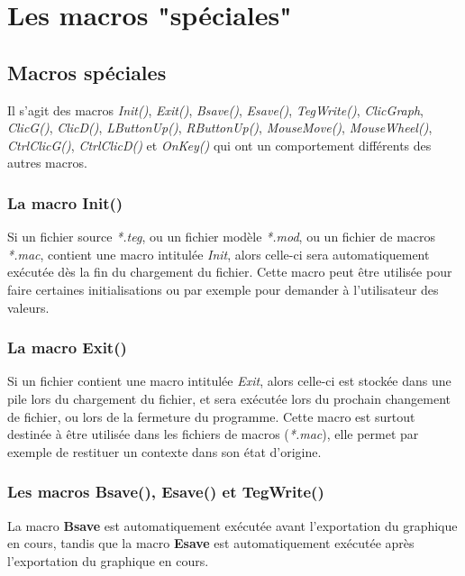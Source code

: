\chapter{Les macros "spéciales"}

\section{Macros spéciales}\label{cmdMacSpec}

Il s'agit des macros \textsl{Init()}, \textsl{Exit()}, \textsl{Bsave()}, \textsl{Esave()}, \textsl{TegWrite()},
\textsl{ClicGraph}, \textsl{ClicG()}, \textsl{ClicD()}, \textsl{LButtonUp()}, \textsl{RButtonUp()}, \textsl{MouseMove()}, \textsl{MouseWheel()}, \textsl{CtrlClicG()}, \textsl{CtrlClicD()} et \textsl{OnKey()} qui ont un
comportement différents des autres macros.


\subsection{La macro Init()}

Si un fichier source \textit{*.teg}, ou un fichier modèle \textit{*.mod}, ou un fichier de macros \textit{*.mac}, contient une macro intitulée \textsl{Init}, alors celle-ci sera automatiquement exécutée dès la fin du chargement du fichier. Cette macro peut être utilisée pour faire certaines initialisations ou par exemple pour demander à l'utilisateur des valeurs. 

\subsection{La macro Exit()}

Si un fichier contient une macro intitulée \textsl{Exit}, alors celle-ci est stockée dans une pile lors du chargement du fichier, et sera exécutée lors du prochain changement de fichier, ou lors de la fermeture du programme. Cette macro est surtout destinée à être utilisée dans les fichiers de macros (\textit{*.mac}), elle permet par exemple de restituer un contexte dans son état d'origine.


\subsection[Les macros liées à l'export]{Les macros Bsave(), Esave() et TegWrite()}\label{macBsave}\label{macEsave}

La macro \textbf{Bsave} est automatiquement exécutée avant l'exportation du graphique en cours, tandis que la macro
\textbf{Esave} est automatiquement exécutée après l'exportation du graphique en cours.

